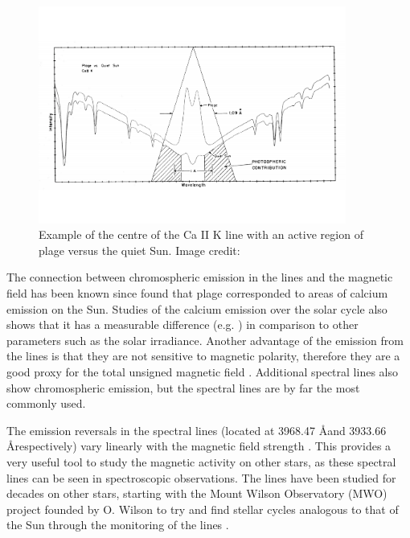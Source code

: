 \begin{figure}
    \centering
    \includegraphics[width=0.9\textwidth]{Figures/1-Introduction/example_ca_emisison.pdf}
    \caption[Example of chromospheric emission in the Ca II K line]{Example of the centre of the Ca II K line with an active region of plage versus the quiet Sun. Image credit: \citet{Hartmann_etal_1984}}
    \label{fig:Chp1_eg_Ca_emission}
\end{figure}

The connection between chromospheric emission in the \caII lines and the magnetic field has been known since \citet{Leighton_1959} found that plage corresponded to areas of calcium emission on the Sun. Studies of the calcium emission over the solar cycle also shows that it has a measurable difference (e.g. \citealt{White_Livingston_1981}) in comparison to other parameters such as the solar irradiance. Another advantage of the emission from the \caII lines is that they are not sensitive to magnetic polarity, therefore they are a good proxy for the total unsigned magnetic field \citep{Linsky_Avrett_1970}. Additional spectral lines also show chromospheric emission, but the \caII spectral lines are by far the most commonly used.

The emission reversals in the \caII spectral lines (located at 3968.47 \AA \space and 3933.66 \AA \space respectively) vary linearly with the magnetic field strength \citep{Frazier_1970}. This provides a very useful tool to study the magnetic activity on other stars, as these spectral lines can be seen in spectroscopic observations. The \caII lines have been studied for decades on other stars, starting with the Mount Wilson Observatory (MWO) project founded by O. Wilson to try and find stellar cycles analogous to that of the Sun through the monitoring of the \caII lines \citep{Wilson_1968}.

